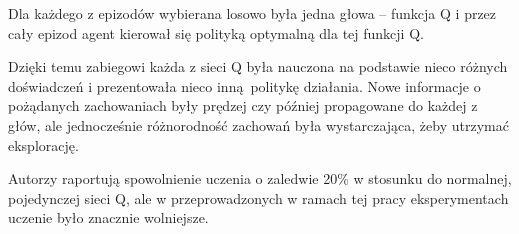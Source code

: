 Dla każdego z epizodów wybierana losowo była jedna głowa – funkcja Q i przez cały epizod agent kierował się polityką optymalną dla tej funkcji Q.

Dzięki temu zabiegowi każda z sieci Q była nauczona na podstawie nieco różnych doświadczeń i prezentowała nieco inną politykę działania. Nowe informacje o pożądanych zachowaniach były prędzej czy później propagowane do każdej z głów, ale jednocześnie różnorodność zachowań była wystarczająca, żeby utrzymać eksplorację.

Autorzy raportują spowolnienie uczenia o zaledwie 20\% w stosunku do normalnej, pojedynczej sieci Q, ale w przeprowadzonych w ramach tej pracy eksperymentach uczenie było znacznie wolniejsze.
